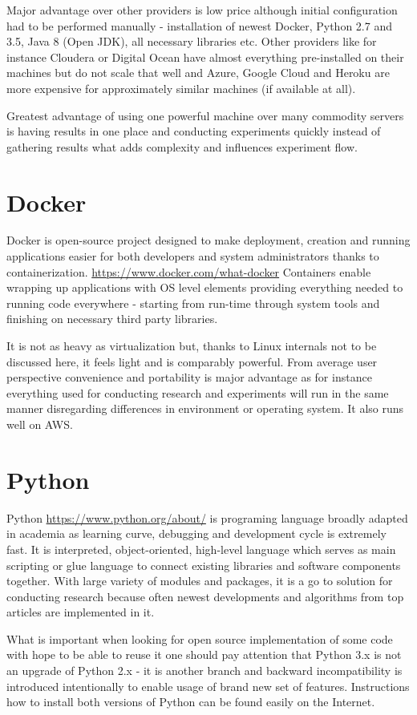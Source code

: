 \documentclass[a4paper, 12pt, oneside]{Thesis} %
\begin{document}
Major advantage over other providers is low price although initial configuration had to be performed manually - installation of newest Docker, Python 2.7 and 3.5, Java 8 (Open JDK), all necessary libraries etc. Other providers like for instance Cloudera or Digital Ocean have almost everything pre-installed on their machines but do not scale that well and Azure, Google Cloud and Heroku are more expensive for approximately similar machines (if available at all).

Greatest advantage of using one powerful machine over many commodity servers is having results in one place and conducting experiments quickly instead of gathering results what adds complexity and influences experiment flow.

\section{Docker} Docker is open-source project designed to make deployment, creation and running applications easier for both developers and system administrators thanks to containerization. \url{https://www.docker.com/what-docker} Containers enable wrapping up applications with OS level elements providing everything needed to running code everywhere - starting from run-time through system tools and finishing on necessary third party libraries. 

It is not as heavy as virtualization but, thanks to Linux internals not to be discussed here, it feels light and is comparably powerful. From average user perspective convenience and portability is major advantage as for instance everything used for conducting research and experiments will run in the same manner disregarding differences in environment or operating system. It also runs well on AWS. 

\section{Python} Python \url{https://www.python.org/about/} is programing language broadly adapted in academia as learning curve, debugging and development cycle is extremely fast. It is interpreted, object-oriented, high-level language which serves as main scripting or glue language to connect existing libraries and software components together. With large variety of modules and packages, it is a go to solution for conducting research because often newest developments and algorithms from top articles are implemented in it. 

What is important when looking for open source implementation of some code with hope to be able to reuse it one should pay attention that Python 3.x is not an upgrade of Python 2.x - it is another branch and backward incompatibility is introduced intentionally to enable usage of brand new set of features. Instructions how to install both versions of Python can be found easily on the Internet.
\end{document}
